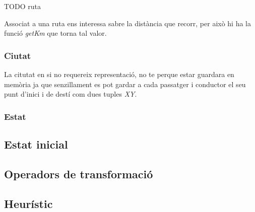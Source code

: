 TODO ruta


Associat a una ruta ens interessa sabre la distància que recorr, per això hi ha la funció \emph{getKm}
que torna tal valor.





\subsubsection{Ciutat}
La citutat en si no requereix representació, no te perque estar guardara en memòria ja que senzillament
es pot gardar a cada passatger i conductor el seu punt d'inici i de destí com dues tuples \emph{XY}.

\subsubsection{Estat}

\subsection{Estat inicial}


\subsection{Operadors de transformació}


\subsection{Heurístic}